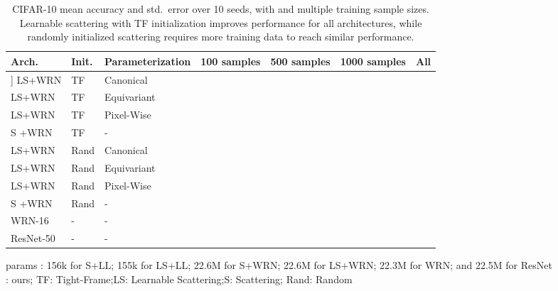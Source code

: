 \documentclass[10pt,twocolumn,letterpaper]{article}
\begin{document}
\begin{table*}[t] 
    \centering
    \caption{CIFAR-10 mean accuracy and std.\ error over 10 seeds, with  and multiple training sample sizes. Learnable scattering with TF initialization improves performance for all architectures, while randomly initialized scattering requires more training data to reach similar performance.} 
    \label{table:cifarresults}
    \fontsize{8}{8.5}\selectfont 
    \begin{tabularx}{0.75\linewidth}{lllllll} 
          \hline
        Arch. &Init. &Parameterization & 100 samples &500 samples & 1000 samples & All \\
        \hline
        \-2mm]
         LS+WRN&TF &Canonical& &  && \\ 
         LS+WRN&TF &Equivariant& &  &&  \\  
         LS+WRN&TF &Pixel-Wise& &  & & \\
        S +WRN&TF &-& &  & & \\ 
       LS+WRN& Rand &Canonical&  &  && \\
        LS+WRN&Rand &Equivariant& &  &&  \\
        LS+WRN& Rand &Pixel-Wise& &  &&  \\
        S +WRN&Rand &-& &  && \\
        WRN-16&-&-&  &  &&   \\
       ResNet-50&-&-&  &  &&   \\ \hline
    \end{tabularx}
\begin{flushleft}
\scriptsize
\vspace{-5pt}
\hspace{65pt} params : 156k for S+LL; 155k for LS+LL; 22.6M for S+WRN;  22.6M for LS+WRN; 22.3M for WRN; and 22.5M for ResNet\\
\hspace{65pt}: ours;\hspace{5pt}  TF: Tight-Frame;\hspace{5pt}LS: Learnable Scattering;\hspace{5pt}S: Scattering;\hspace{5pt} Rand: Random\\
\end{flushleft}
\vspace{-20pt}
\end{table*} 
\end{document}
